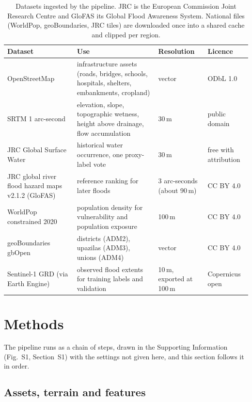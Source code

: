 \documentclass[10pt,a4paper,twocolumn]{article}
\begin{document}
\begin{table}[tp]
\centering
\small
\begin{tabularx}{\textwidth}{lXll}
\toprule
Dataset & Use & Resolution & Licence \\
\midrule
OpenStreetMap & infrastructure assets (roads, bridges, schools, hospitals, shelters, embankments, cropland) & vector & ODbL 1.0 \\
SRTM 1 arc-second & elevation, slope, topographic wetness, height above drainage, flow accumulation & 30\,m & public domain \\
JRC Global Surface Water & historical water occurrence, one proxy-label vote & 30\,m & free with attribution \\
JRC global river flood hazard maps v2.1.2 (GloFAS) & reference ranking for later floods & 3 arc-seconds (about 90\,m) & CC BY 4.0 \\
WorldPop constrained 2020 & population density for vulnerability and population exposure & 100\,m & CC BY 4.0 \\
geoBoundaries gbOpen & districts (ADM2), upazilas (ADM3), unions (ADM4) & vector & CC BY 4.0 \\
Sentinel-1 GRD (via Earth Engine) & observed flood extents for training labels and validation & 10\,m, exported at 100\,m & Copernicus open \\
\bottomrule
\end{tabularx}
\caption{Datasets ingested by the pipeline. JRC is the European Commission Joint Research Centre and GloFAS its Global Flood Awareness System. National files (WorldPop, geoBoundaries, JRC tiles) are downloaded once into a shared cache and clipped per region.}
\label{tab:data}
\end{table}

\section{Methods}
\label{sec:chain}

The pipeline runs as a chain of steps, drawn in the Supporting Information (Fig.~S1, Section~S1) with the settings not given here, and this section follows it in order.


\subsection{Assets, terrain and features}
\end{document}
